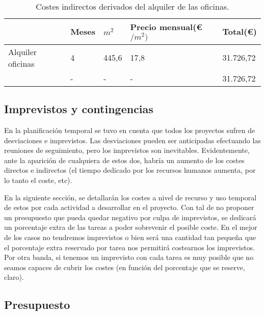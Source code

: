 \begin{table}[H]
\begin{tabular}{l|l|l|l|l|}
\cline{2-5}
                                                    & Meses   & $m^{2}$ & Precio mensual(\euro$/m^{2})$ & Total(\euro) \\ \hline
\multicolumn{1}{|l|}{Alquiler oficinas }            & 4  & 445,6   & 17,8 & 31.726,72     \\ \hline
\rowcolor{gray!50}
\multicolumn{1}{|l|}{Total} & - &   -       &  -              &   31.726,72       \\ \hline
\end{tabular}
\caption{Costes indirectos derivados del alquiler de las oficinas.}
\end{table}

\subsection{Imprevistos y contingencias}

En la planificación temporal se tuvo en cuenta que todos los proyectos sufren de desviaciones e imprevistos. Las desviaciones pueden ser anticipadas efectuando las reuniones de seguimiento, pero los imprevistos son inevitables. Evidentemente, ante la aparición de cualquiera de estos dos, habría un aumento de los costes directos e indirectos (el tiempo dedicado por los recursos humanos aumenta, por lo tanto el coste, etc).
\par\medskip
En la siguiente sección, se detallarán los costes a nivel de recurso y uso temporal de estos por cada actividad a desarrollar en el proyecto. Con tal de no proponer un presupuesto que pueda quedar negativo por culpa de imprevistos, se dedicará un porcentaje extra de las tareas a poder sobrevenir el posible coste.
En el mejor de los casos no tendremos imprevistos o bien será una cantidad tan pequeña que el porcentaje extra reservado por tarea nos permitirá costearnos los imprevistos. Por otra banda, si tenemos un imprevisto con cada tarea es muy posible que no seamos capaces de cubrir los costes (en función del porcentaje que se reserve, claro).

\subsection{Presupuesto}


